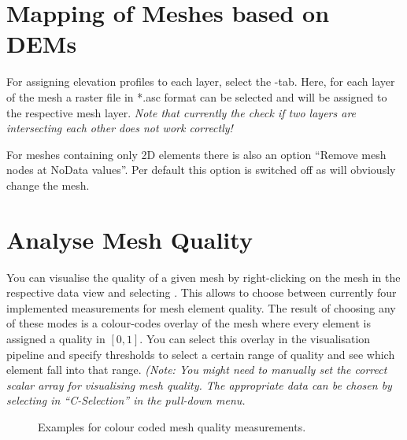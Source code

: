 \section{Mapping of Meshes based on DEMs}

For assigning elevation profiles to each layer, select the -tab. Here, for each layer of the mesh a raster file in *.asc format can be selected and will be assigned to the respective mesh layer.
\emph{Note that currently the check if two layers are intersecting each other does \emph{not} work correctly!}

For meshes containing only 2D elements there is also an option ``Remove mesh nodes at NoData values''. Per default this option is switched off as will obviously change the mesh.

\section{Analyse Mesh Quality}

You can visualise the quality of a given mesh by right-clicking on the mesh in the respective data view and selecting . This allows to choose between currently four implemented measurements for mesh element quality. The result of choosing any of these modes is a colour-codes overlay of the mesh where every element is assigned a quality in $[0,1]$. You can select this overlay in the visualisation pipeline and specify thresholds to select a certain range of quality and see which element fall into that range. \emph{(Note: You might need to manually set the correct scalar array for visualising mesh quality. The appropriate data can be chosen by selecting in ``C-Selection'' in the  pull-down menu.}

\begin{figure}[tb]
\begin{center}
\enspace
{}\enspace
{}
\end{center}
\caption{Examples for colour coded mesh quality measurements.} \label{fig:mshqual}
\end{figure}

